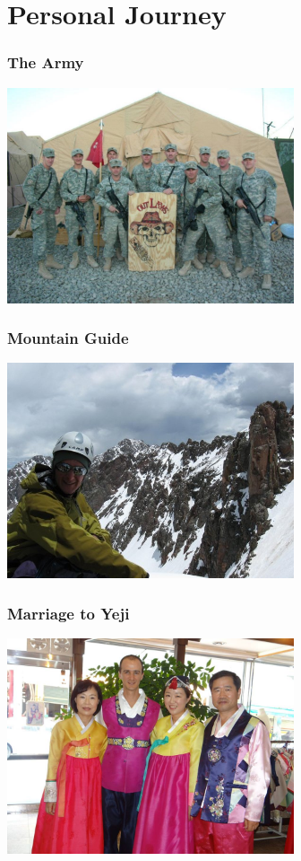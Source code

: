 \documentclass{beamer}
\begin{document}
\section{Personal Journey}
\begin{frame}


\frametitle{The Army }

\centerline{\includegraphics[height=2.5in]{figs/army.jpg}}


\end{frame}
\begin{frame}


\frametitle{Mountain Guide }

\centerline{\includegraphics[height=2.5in]{figs/mountains.jpg}}


\end{frame}
\begin{frame}


\frametitle{Marriage to Yeji}

\centerline{\includegraphics[height=2.5in]{figs/korea.jpg}}


\end{frame}
\end{document}
